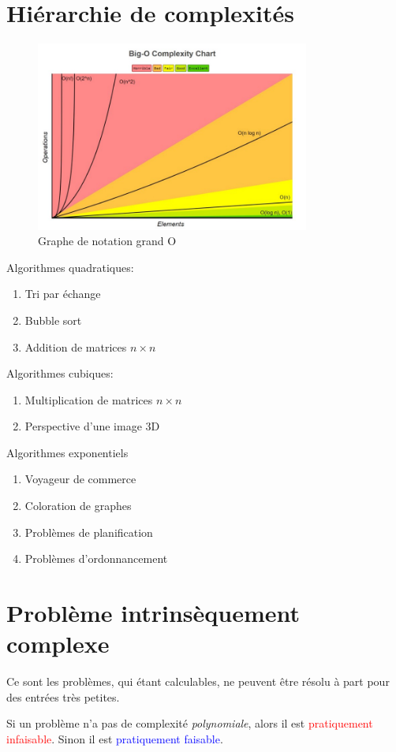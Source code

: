 \documentclass{report}
\begin{document}
\section{Hiérarchie de complexités}
\begin{figure}[H]
\centering
\includegraphics[width=9cm]{img/BigO.jpeg}
\caption{Graphe de notation grand O}
\end{figure}
\noindent
Algorithmes quadratiques:
\begin{enumerate}
\item Tri par échange
\item Bubble sort
\item Addition de matrices $n\times n$
\end{enumerate}
Algorithmes cubiques:
\begin{enumerate}
\item Multiplication de matrices $n \times n$
\item Perspective d'une image 3D
\end{enumerate}
Algorithmes exponentiels
\begin{enumerate}
\item Voyageur de commerce
\item Coloration de graphes
\item Problèmes de planification
\item Problèmes d'ordonnancement 
\end{enumerate}

\section{Problème intrinsèquement complexe}
Ce sont les problèmes, qui étant calculables, ne peuvent être résolu à part pour des entrées très petites.\par
Si un problème n'a pas de complexité \textit{polynomiale}, alors il est \textcolor{red}{pratiquement infaisable}. Sinon il est \textcolor{blue}{pratiquement faisable}.\\
\end{document}
